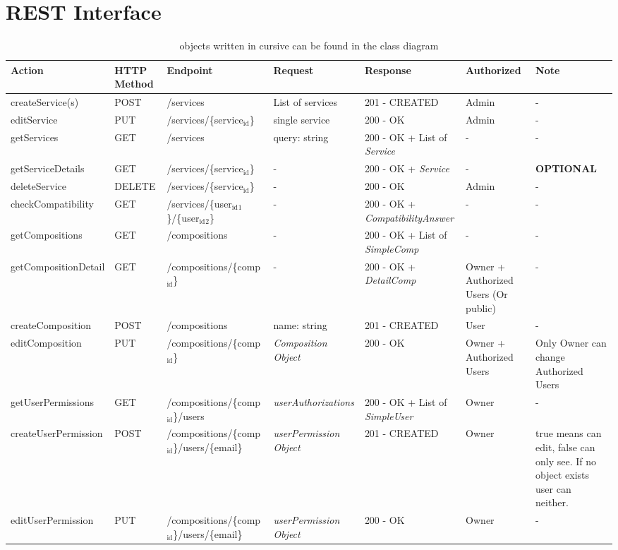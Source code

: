 \documentclass[11pt]{article}
\author{Christian Richter}
\date{\today}
\title{}
\begin{document}
\section{REST Interface}
\label{sec:org5724d34}
\begin{table}[htbp]
\caption{objects written in cursive can be found in the class diagram}
\centering
\begin{tabular}{lllllll}
Action & HTTP Method & Endpoint & Request & Response & Authorized & Note\\
\hline
createService(s) & POST & /services & List of services & 201 - CREATED & Admin & -\\
editService & PUT & /services/\{service\(_{\text{id}}\)\} & single service & 200 - OK & Admin & -\\
getServices & GET & /services & query: string & 200 - OK + List of \emph{Service} & - & -\\
getServiceDetails & GET & /services/\{service\(_{\text{id}}\)\} & - & 200 - OK + \emph{Service} & - & \textbf{OPTIONAL}\\
deleteService & DELETE & /services/\{service\(_{\text{id}}\)\} & - & 200 - OK & Admin & -\\
\hline
checkCompatibility & GET & /services/\{user\(_{\text{id}}\)\(_{\text{1}}\)\}/\{user\(_{\text{id}}\)\(_{\text{2}}\)\} & - & 200 - OK + \emph{CompatibilityAnswer} & - & -\\
\hline
getCompositions & GET & /compositions & - & 200 - OK + List of \emph{SimpleComp} & - & -\\
getCompositionDetail & GET & /compositions/\{comp\(_{\text{id}}\)\} & - & 200 - OK + \emph{DetailComp} & Owner + Authorized Users (Or public) & -\\
createComposition & POST & /compositions & name: string & 201 - CREATED & User & -\\
editComposition & PUT & /compositions/\{comp\(_{\text{id}}\)\} & \emph{Composition Object} & 200 - OK & Owner + Authorized Users & Only Owner can change Authorized Users\\
\hline
getUserPermissions & GET & /compositions/\{comp\(_{\text{id}}\)\}/users & \emph{userAuthorizations} & 200 - OK + List of \emph{SimpleUser} & Owner & -\\
createUserPermission & POST & /compositions/\{comp\(_{\text{id}}\)\}/users/\{email\} & \emph{userPermission Object} & 201 - CREATED & Owner & true means can edit, false can only see. If no object exists user can neither.\\
editUserPermission & PUT & /compositions/\{comp\(_{\text{id}}\)\}/users/\{email\} & \emph{userPermission Object} & 200 - OK & Owner & -\\

\end{tabular}
\end{table}
\end{document}
